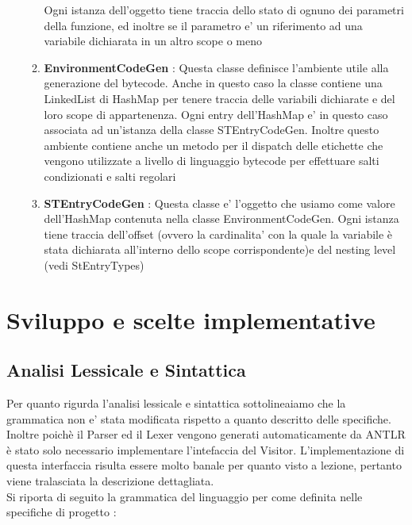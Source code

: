 \documentclass{article}
\begin{document}
\begin{itemize}
\begin{enumerate}
            Ogni istanza dell'oggetto tiene traccia dello stato di ognuno dei parametri della funzione, ed inoltre se il parametro e' un riferimento ad una variabile dichiarata in un altro scope o meno
            \item \textbf{EnvironmentCodeGen} : Questa classe definisce l'ambiente utile alla generazione del bytecode. Anche in questo caso la classe contiene una LinkedList di HashMap per tenere traccia delle variabili dichiarate e del loro scope di appartenenza. Ogni entry dell'HashMap e' in questo caso associata ad un'istanza della classe STEntryCodeGen. Inoltre questo ambiente contiene anche un metodo per il dispatch delle etichette che vengono utilizzate a livello di linguaggio bytecode per effettuare salti condizionati e salti regolari
            \item \textbf{STEntryCodeGen} : Questa classe e' l'oggetto che usiamo come valore dell'HashMap contenuta nella classe EnvironmentCodeGen. Ogni istanza tiene traccia dell'offset (ovvero la cardinalita' con la quale la variabile è stata dichiarata all'interno dello scope corrispondente)e del nesting level (vedi StEntryTypes)
      \end{enumerate}
      
 \end{itemize}
 
\newpage
\section{Sviluppo e scelte implementative}
\subsection{Analisi Lessicale e Sintattica}
Per quanto rigurda l'analisi  lessicale e sintattica sottolineaiamo che la grammatica non e' stata modificata  rispetto a quanto descritto delle specifiche. Inoltre poichè il Parser ed il Lexer vengono generati automaticamente da ANTLR è stato solo necessario implementare l'intefaccia del Visitor. L'implementazione di questa interfaccia risulta essere molto banale per quanto visto a lezione, pertanto viene tralasciata la descrizione dettagliata. \\

Si riporta di seguito la grammatica del linguaggio per come definita nelle specifiche di progetto : \\

\end{document}

